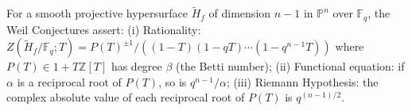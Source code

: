For a smooth projective hypersurface $\tilde{H}_f$ of dimension $n-1$ in $\mathbb{P}^n$ over $\mathbb{F}_q$, the Weil Conjectures assert: (i) Rationality: $Z(\tilde{H}_f/\mathbb{F}_q; T) = P(T)^{\pm 1} / ((1-T)(1-qT)\cdots(1-q^{n-1}T))$ where $P(T) \in 1+T\mathbb{Z}[T]$ has degree $\beta$ (the Betti number); (ii) Functional equation: if $\alpha$ is a reciprocal root of $P(T)$, so is $q^{n-1}/\alpha$; (iii) Riemann Hypothesis: the complex absolute value of each reciprocal root of $P(T)$ is $q^{(n-1)/2}$.